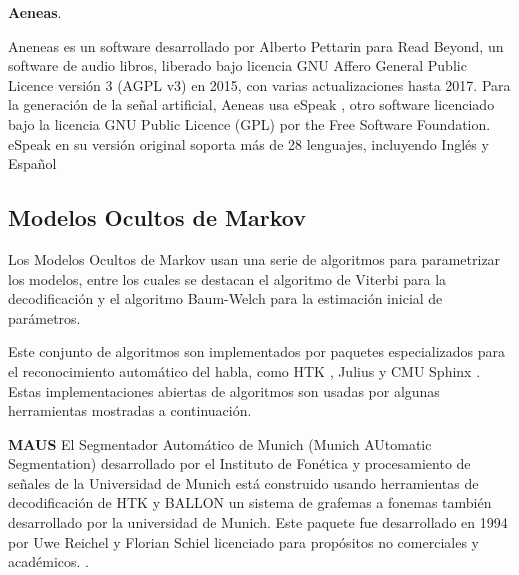 \textbf{Aeneas}.

Aneneas \cite{aeneas} es un software desarrollado por Alberto Pettarin para Read Beyond, un software de audio libros, liberado bajo licencia GNU Affero General Public Licence versión 3 (AGPL v3) en 2015, con varias actualizaciones hasta 2017. Para la generación de la señal artificial, Aeneas usa eSpeak \cite{espeak}, otro software licenciado bajo la licencia GNU Public Licence (GPL) por the Free Software Foundation. eSpeak en su versión original soporta más de 28 lenguajes, incluyendo Inglés y Español

\subsection{Modelos Ocultos de Markov}

Los Modelos Ocultos de Markov usan una serie de algoritmos para parametrizar los modelos, entre los cuales se destacan el algoritmo de Viterbi para la decodificación \cite{Forney1973TheAlgorithm} y el algoritmo Baum-Welch para la estimación inicial de parámetros.

Este conjunto de algoritmos son implementados por paquetes especializados para el reconocimiento automático del habla, como  HTK \cite{Young1994ThePhilosophy}, Julius \cite{LeeEurospeechEngine} y CMU Sphinx \cite{Lee1990AnSystem}. Estas implementaciones abiertas de algoritmos son usadas por algunas herramientas mostradas a continuación.

\textbf{MAUS}
El Segmentador Automático de Munich (Munich AUtomatic Segmentation) desarrollado por el Instituto de Fonética y procesamiento de señales de la Universidad de Munich está construido usando herramientas de decodificación de HTK y BALLON un sistema de grafemas a fonemas también desarrollado por la  universidad de Munich. Este paquete fue desarrollado en 1994 por Uwe Reichel y Florian Schiel licenciado para propósitos no comerciales y académicos. \cite{WesenickAPPLYINGPRONUNCIATION}. 

